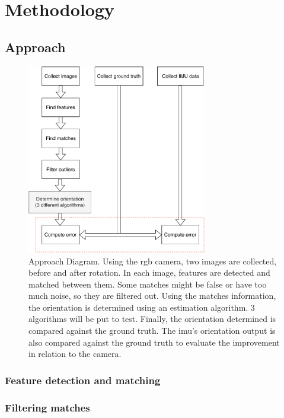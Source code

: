 
\chapter{Methodology}
\label{methodology}

\section{Approach}

\begin{figure}[ht]
	\centering
	\includegraphics[width=0.7\textwidth]{images/approach.pdf}
	\caption[Approach Diagram]{Approach Diagram. Using the \acrshort{rgb} camera, two images are collected, before and after rotation. In each image, features are detected and matched between them. Some matches might be false or have too much noise, so they are filtered out. Using the matches information, the orientation is determined using an estimation algorithm. 3 algorithms will be put to test. Finally, the orientation determined is compared against the ground truth. The \acrshort{imu}'s orientation output is also compared against the ground truth to evaluate the improvement in relation to the camera.}
	\label{cha3:methodology:approach}
\end{figure}


\subsection{Feature detection and matching}

\subsection{Filtering matches}

